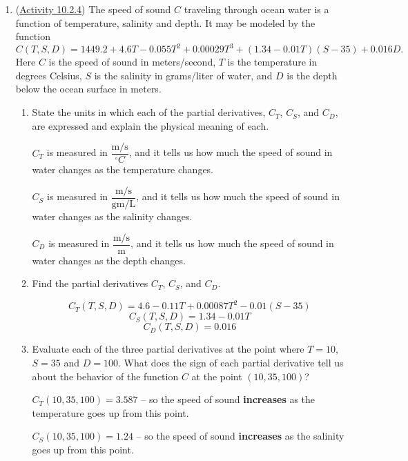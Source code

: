 \begin{enumerate}[leftmargin=0pt]
\item (\href{https://activecalculus.org/multi/S-10-2-First-Order-Partial-Derivatives.html#A_10_2_11}{Activity 10.2.4}) The speed of sound $C$ traveling through ocean water is a function of temperature, salinity and depth. It may be modeled by the function
\begin{equation*}
C(T,S, D)=1449.2+4.6T-0.055T^2+0.00029T^3+(1.34-0.01T)(S-35)+0.016D.
\end{equation*}
Here $C$ is the speed of sound in meters/second, $T$ is the temperature in degrees Celsius, $S$ is the salinity in grams/liter of water, and $D$ is the depth below the ocean surface in meters.
\begin{enumerate}
    \item State the units in which each of the partial derivatives, $C_T$, $C_S$, and $C_D$, are expressed and explain the physical meaning of each.
    
    \begin{red}
    $C_T$ is measured in $\dfrac{\textrm{m/s}}{^\circ C}$, and it tells us how much the speed of sound in water changes as the temperature changes.
    
    $C_S$ is measured in $\dfrac{\textrm{m/s}}{\textrm{gm/L}}$, and it tells us how much the speed of sound in water changes as the salinity changes.
    
    $C_D$ is measured in $\dfrac{\textrm{m/s}}{\textrm{m}}$, and it tells us how much the speed of sound in water changes as the depth changes.
    \end{red}
    \item Find the partial derivatives $C_T$, $C_S$, and $C_D$. 
    
    \begin{red}
    \[C_T(T,S, D) = 4.6 - 0.11 T + 0.00087 T^2 -0.01(S-35) \]
    \[C_S(T,S, D) = 1.34-0.01T \]
    \[C_D(T,S, D) = 0.016\]
    \end{red}
    \item Evaluate each of the three partial derivatives at the point where $T=10$, $S=35$ and $D=100$. What does the sign of each partial derivative tell us about the behavior of the function $C$ at the point $(10, 35, 100)$?
    
    \begin{red}
    $C_T(10, 35, 100) = 3.587$ -- so the speed of sound \textbf{increases} as the temperature goes up from this point.
    
    $C_S(10, 35, 100) = 1.24$ -- so the speed of sound \textbf{increases} as the salinity goes up from this point.
    

\end{red}
\end{enumerate}
\end{enumerate}
